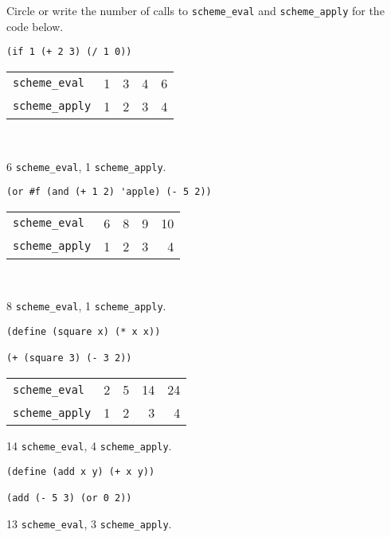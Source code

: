 \begin{blocksection}
\question Circle or write the number of calls to \lstinline$scheme_eval$ and
\lstinline$scheme_apply$ for the code below.

\begin{lstlisting}
(if 1 (+ 2 3) (/ 1 0))
\end{lstlisting}

\begin{tabular}{lrrrr}
\lstinline$scheme_eval$ & 1 & 3 & 4 & 6 \\
\lstinline$scheme_apply$ & 1 & 2 & 3 & 4
\end{tabular}
\\

\begin{solution}
6 \lstinline$scheme_eval$, 1 \lstinline$scheme_apply$.
\end{solution}

\vspace{2\baselineskip}
\begin{lstlisting}
(or #f (and (+ 1 2) 'apple) (- 5 2))
\end{lstlisting}

\begin{tabular}{lrrrr}
\lstinline$scheme_eval$ & 6 & 8 & 9 & 10 \\
\lstinline$scheme_apply$ & 1 & 2 & 3 & 4
\end{tabular}
\\

\begin{solution}
8 \lstinline$scheme_eval$, 1 \lstinline$scheme_apply$.
\end{solution}

\vspace{2\baselineskip}
\begin{lstlisting}
(define (square x) (* x x))

(+ (square 3) (- 3 2))
\end{lstlisting}

\begin{tabular}{lrrrr}
\lstinline$scheme_eval$ & 2 & 5 & 14 & 24 \\
\lstinline$scheme_apply$ & 1 & 2 & 3 & 4
\end{tabular}

\begin{solution}
14 \lstinline$scheme_eval$, 4 \lstinline$scheme_apply$.
\end{solution}

\vspace{2\baselineskip}
\begin{lstlisting}
(define (add x y) (+ x y))

(add (- 5 3) (or 0 2))
\end{lstlisting}

\begin{solution}[1in]
13 \lstinline$scheme_eval$, 3 \lstinline$scheme_apply$.
\end{solution}

\end{blocksection}
